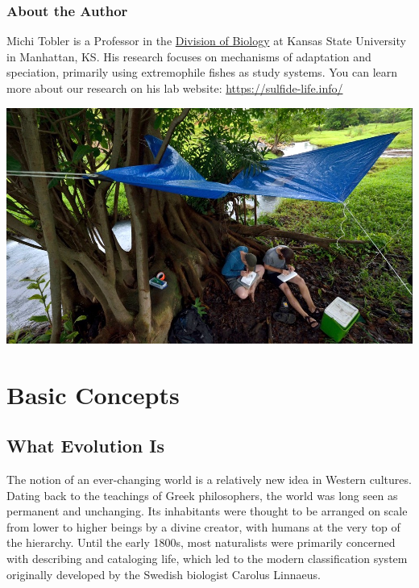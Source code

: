 \documentclass[
]{book}
\begin{document}
\hypertarget{about-the-author}{%
\section*{About the Author}\label{about-the-author}}

Michi Tobler is a Professor in the \href{https://www.k-state.edu/biology/}{Division of Biology} at Kansas State University in Manhattan, KS. His research focuses on mechanisms of adaptation and speciation, primarily using extremophile fishes as study systems. You can learn more about our research on his lab website: \url{https://sulfide-life.info/}

\includegraphics[width=1\linewidth]{images/fieldlab}

\hypertarget{part-basic-concepts}{%
\part{Basic Concepts}\label{part-basic-concepts}}

\hypertarget{what-evolution-is}{%
\chapter{What Evolution Is}\label{what-evolution-is}}

The notion of an ever-changing world is a relatively new idea in Western cultures. Dating back to the teachings of Greek philosophers, the world was long seen as permanent and unchanging. Its inhabitants were thought to be arranged on scale from lower to higher beings by a divine creator, with humans at the very top of the hierarchy. Until the early 1800s, most naturalists were primarily concerned with describing and cataloging life, which led to the modern classification system originally developed by the Swedish biologist Carolus Linnaeus.
\end{document}

